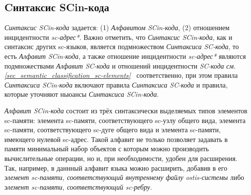 \subsection{Cинтаксис SCin-кода}
\label{sec_soft_platform_scin_code_alphabet_and_syntax}

\textit{Синтаксис SCin-кода} задается: (1) \textit{Алфавитом SCin-кода}, (2) отношением инцидентности \textit{sc-адрес*}. Важно отметить, что \textit{Синтаксис SCin-кода}, как и синтаксис других sc-языков, является подмножеством \textit{Синтаксиса SC-кода}, то есть \textit{Алфавит SCin-кода\scnsupergroupsign}, а также отношение инцидентности \textit{sc-адрес*} являются подмножествами \textit{Алфавит SC-кода\scnsupergroupsign} и отношений инцидентности \textit{SC-кода} \textit{см. \ref{sec_semantic_classification_sc-elements}~} соответственно, при этом правила \textit{Синтаксиса SCin-кода} включают правила \textit{Синтаксиса SC-кода} и правила, которые уточняют ньюансы \textit{Синтаксиса SCin-кода}.

\begin{SCn}
\begin{scneqtoset}
    \begin{scnindent}
    \end{scnindent}
\end{scneqtoset}
\end{SCn}

\textit{Алфавит SCin-кода\scnsupergroupsign} состоит из трёх синтаксически выделяемых типов элементов sc-памяти: элемента sc-памяти, соответствующего sc-узлу общего вида, элемента sc-памяти, соответствующего sc-дуге общего вида и элемента sc-памяти, имеющего нулевой sc-адрес. Такой алфавит не только позволяет задавать в памяти минимальный набор объектов с которым можно производить вычислительные операции, но и, при необходимости, удобен для расширения. Так, например, в даннный алфавит языка можно расширить, добавив в его \textit{элемент sc-памяти, соответствующий внутреннему файлу ostis-системы} либо \textit{элемент sc-памяти, соответствующий sc-ребру}.

\begin{SCn}
\end{SCn}

